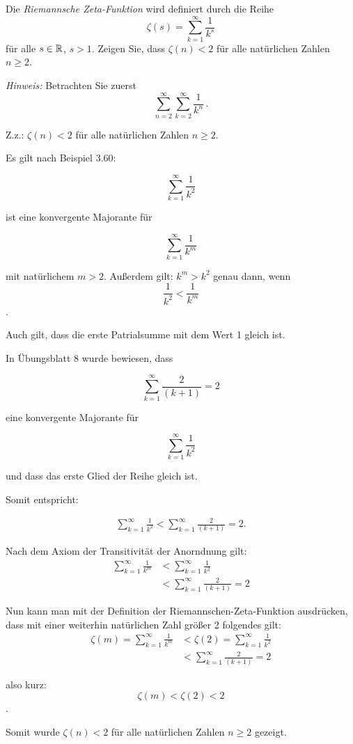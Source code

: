 \bigskip


\begin{aufg}[6 Punkte]
Die \textit{Riemannsche Zeta-Funktion} wird definiert durch die Reihe 
\[
\zeta(s) = \sum_{k=1}^{\infty} \frac{1}{k^{s}}
\]
f\"ur alle $s\in \mathbb{R}$, $s>1$. Zeigen Sie, dass $\zeta(n) < 2$ f\"ur alle nat\"urlichen Zahlen $n\geq 2$. 

\noindent
\emph{Hinweis:} Betrachten Sie zuerst
\[
\sum_{n=2}^{\infty} \sum_{k=2}^{\infty} \frac{1}{k^{n}}\,.
\]
\end{aufg}


\bigskip

\begin{lsg}

Z.z.: $\zeta(n) < 2$ f\"ur alle nat\"urlichen Zahlen $n\geq 2$. 


Es gilt nach Beispiel 3.60: 

\[ \displaystyle\sum_{k=1}^{\infty}\frac{1}{k^{2}}\]

ist eine konvergente Majorante für

\[ \displaystyle\sum_{k=1}^{\infty}\frac{1}{k^{m}}\] 

mit natürlichem $m > 2$. Außerdem gilt: $k^m > k^2$  genau dann, wenn  
$$\frac{1}{k^2} < \frac{1}{k^m}$$.

Auch gilt, dass die erste Patrialsumme mit dem Wert 1 gleich ist.

In Übungsblatt 8 wurde bewiesen, dass 

\[ \displaystyle\sum_{k=1}^{\infty}\frac{2}{(k+1)}=2\]

eine konvergente Majorante für 

\[ \displaystyle\sum_{k=1}^{\infty}\frac{1}{k^{2}}\]

und dass das erste Glied der Reihe gleich ist.

Somit entspricht: 


\begin{align*}
 \displaystyle\sum_{k=1}^{\infty}\frac{1}{k^{2}} < 
\displaystyle\sum_{k=1}^{\infty}\frac{2}{(k+1)}=2.
\end{align*}

Nach dem Axiom der Transitivität der Anorndnung gilt: 
\begin{align*}
\displaystyle\sum_{k=1}^{\infty}\frac{1}{k^{m}} 
& < \displaystyle\sum_{k=1}^{\infty}\frac{1}{k^{2}}
\\
& < \displaystyle\sum_{k=1}^{\infty}\frac{2}{(k+1)}=2
\end{align*}

Nun kann man mit der Definition der Riemannschen-Zeta-Funktion ausdrücken, dass 
mit einer weiterhin natürlichen Zahl größer 2 folgendes gilt:
\begin{align*}
 \zeta(m) = \displaystyle\sum_{k=1}^{\infty}\frac{1}{k^{m}}
& <
\zeta(2) = \displaystyle\sum_{k=1}^{\infty}\frac{1}{k^{2}}
\\ 
& <
\displaystyle\sum_{k=1}^{\infty}\frac{2}{(k+1)}=2
\end{align*}

also kurz: $$ \zeta(m) < \zeta(2) < 2 $$.

Somit wurde $\zeta(n) < 2$ f\"ur alle nat\"urlichen Zahlen $n\geq 2$ gezeigt.
\end{lsg}
 
